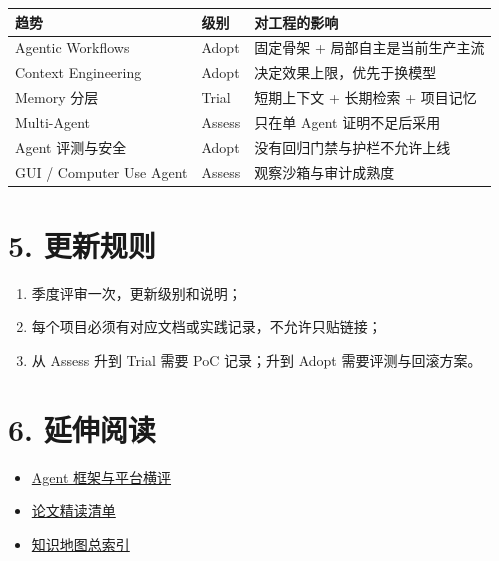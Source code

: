\documentclass[9pt,a4paper,twocolumn]{ctexart}
\begin{document}
{\footnotesize
\begin{tabular}{|p{}|p{}|p{}|}
\hline
\textbf{趋势} & \textbf{级别} & \textbf{对工程的影响} \\
\hline
Agentic Workflows & Adopt & 固定骨架 + 局部自主是当前生产主流 \\
\hline
Context Engineering & Adopt & 决定效果上限，优先于换模型 \\
\hline
Memory 分层 & Trial & 短期上下文 + 长期检索 + 项目记忆 \\
\hline
Multi-Agent & Assess & 只在单 Agent 证明不足后采用 \\
\hline
Agent 评测与安全 & Adopt & 没有回归门禁与护栏不允许上线 \\
\hline
GUI / Computer Use Agent & Assess & 观察沙箱与审计成熟度 \\
\hline
\end{tabular}
}



\section*{5. 更新规则}

\begin{enumerate}[itemsep=1pt, topsep=2pt]
  \item 季度评审一次，更新级别和说明；
  \item 每个项目必须有对应文档或实践记录，不允许只贴链接；
  \item 从 Assess 升到 Trial 需要 PoC 记录；升到 Adopt 需要评测与回滚方案。
\end{enumerate}


\section*{6. 延伸阅读}

\begin{itemize}[itemsep=1pt, topsep=2pt]
  \item \href{../04-工程实践/07-Agent框架选型对比.md}{Agent 框架与平台横评}
  \item \href{02-论文精读清单.md}{论文精读清单}
  \item \href{../../../知识地图总索引.md}{知识地图总索引}
\end{itemize}
\end{document}
